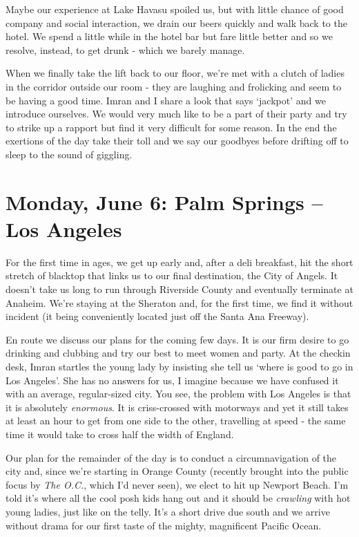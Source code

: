 \documentclass[a5paper,titlepage,11pt]{book}
\begin{document}
Maybe our experience at Lake Havasu spoiled us, but with little chance of good company and social interaction, we drain our beers quickly and walk back to the hotel.  We spend a little while in the hotel bar but fare little better and so we resolve, instead, to get drunk - which we barely manage.

When we finally take the lift back to our floor, we're met with a clutch of ladies in the corridor outside our room - they are laughing and frolicking and seem to be having a good time.  Imran and I share a look that says `jackpot' and we introduce ourselves.  We would very much like to be a part of their party and try to strike up a rapport but find it very difficult for some reason.  In the end the exertions of the day take their toll and we say our goodbyes before drifting off to sleep to the sound of giggling.

\chapter[Palm Springs -- Los Angeles]{Monday, June 6:  Palm Springs -- Los Angeles}
For the first time in ages, we get up early and, after a deli breakfast, hit the short stretch of blacktop that links us to our final destination, the City of Angels.  It doesn't take us long to run through Riverside County and eventually terminate at Anaheim.  We're staying at the Sheraton and, for the first time, we find it without incident (it being conveniently located just off the Santa Ana Freeway).

En route we discuss our plans for the coming few days.  It is our firm desire to go drinking and clubbing and try our best to meet women and party.  At the checkin desk, Imran startles the young lady by insisting she tell us `where is good to go in Los Angeles'.  She has no answers for us, I imagine because we have confused it with an average, regular-sized city.  You see, the problem with Los Angeles is that it is absolutely \emph{enormous}.  It is criss-crossed with motorways and yet it still takes at least an hour to get from one side to the other, travelling at speed - the same time it would take to cross half the width of England.

Our plan for the remainder of the day is to conduct a circumnavigation of the city and, since we're starting in Orange County (recently brought into the public focus by \emph{The O.C.}, which I'd never seen), we elect to hit up Newport Beach.  I'm told it's where all the cool posh kids hang out and it should be \emph{crawling} with hot young ladies, just like on the telly.  It's a short drive due south and we arrive without drama for our first taste of the mighty, magnificent Pacific Ocean.
\end{document}
